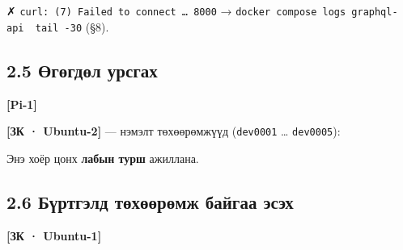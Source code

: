 ✗ \texttt{curl:\allowbreak{}\ (7)\ Failed\ to\ connect\ \ldots{}\ 8000} → \texttt{docker\ compose\ logs\ graphql-api\ \textbar{}\ tail\ -30} (§8).

\hypertarget{ux4e9ux433ux4e9ux433ux434ux4e9ux43b-ux443ux440ux441ux433ux430ux445}{%
\subsection{2.5 Өгөгдөл урсгах}\label{ux4e9ux433ux4e9ux433ux434ux4e9ux43b-ux443ux440ux441ux433ux430ux445}}

\textbf{{[}Pi-1{]}}

\begin{Shaded}
\begin{Highlighting}[]
\KeywordTok{\&\&} \KeywordTok{\&\&} 
\end{Highlighting}
\end{Shaded}

\textbf{{[}ЗК · Ubuntu-2{]}} --- нэмэлт төхөөрөмжүүд (\texttt{dev0001} \ldots{} \texttt{dev0005}):

\begin{Shaded}
\begin{Highlighting}[]
\end{Highlighting}
\end{Shaded}

Энэ хоёр цонх \textbf{лабын турш} ажиллана.

\hypertarget{ux431ux4afux440ux442ux433ux44dux43bux434-ux442ux4e9ux445ux4e9ux4e9ux440ux4e9ux43cux436-ux431ux430ux439ux433ux430ux430-ux44dux441ux44dux445}{%
\subsection{2.6 Бүртгэлд төхөөрөмж байгаа эсэх}\label{ux431ux4afux440ux442ux433ux44dux43bux434-ux442ux4e9ux445ux4e9ux4e9ux440ux4e9ux43cux436-ux431ux430ux439ux433ux430ux430-ux44dux441ux44dux445}}

\textbf{{[}ЗК · Ubuntu-1{]}}

\begin{Shaded}
\begin{Highlighting}[]
 \KeywordTok{|}  
\end{Highlighting}
\end{Shaded}

